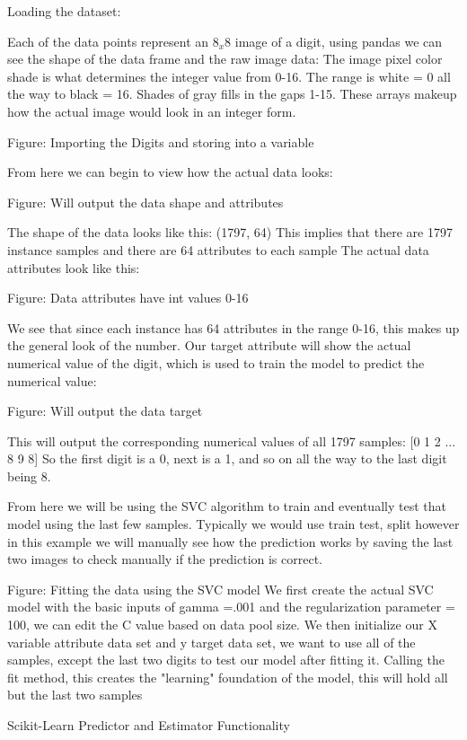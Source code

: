 \documentclass[a4paper,12pt]{report}
\begin{document}
Loading the dataset:

Each of the data points represent an $8_x8$ image of a digit, using pandas we can see the shape of the data frame and the raw image data:
The image pixel color shade is what determines the integer value from 0-16. The range is white = 0 all the way to black = 16. Shades of gray fills in the gaps 1-15. These arrays makeup how the actual image would look in an integer form.

	
Figure: Importing the Digits and storing into a variable

From here we can begin to view how the actual data looks:


Figure: Will output the data shape and attributes

The shape of the data looks like this:
(1797, 64)
This implies that there are 1797 instance samples and there are 64 attributes to each sample
The actual data attributes look like this:


Figure: Data attributes have int values 0-16

We see that since each instance has 64 attributes in the range 0-16, this makes up the general look of the number. Our target attribute will show the actual numerical value of the digit, which is used to train the model to predict the numerical value:


Figure: Will output the data target

This will output the corresponding numerical values of all 1797 samples:
[0 1 2 ... 8 9 8]
So the first digit is a 0, next is a 1, and so on all the way to the last digit being 8.

From here we will be using the SVC algorithm to train and eventually test that model using the last few samples. Typically we would use train test, split however in this example we will manually see how the prediction works by saving the last two images to check manually if the prediction is correct.


Figure: Fitting the data using the SVC model
We first create the actual SVC model with the basic inputs of gamma =.001 and the regularization parameter = 100, we can edit the C value based on data pool size.
We then initialize our X variable attribute data set and y target data set, we want to use all of the samples, except the last two digits to test our model after fitting it.
Calling the fit method, this creates the "learning" foundation of the model, this will hold all but the last two samples

Scikit-Learn Predictor and Estimator Functionality
\end{document}
